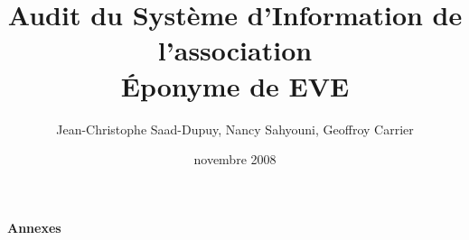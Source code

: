 \documentclass[a4paper,10pt,twoside]{article}
\title{Audit du Système d'Information de l'association \\ \Huge{Éponyme de EVE}}
\author{Jean-Christophe Saad-Dupuy, Nancy Sahyouni, Geoffroy Carrier}
\date{novembre 2008}
\begin{document}
\maketitle

\tableofcontents






\newpage
\appendix
\textbf{\Huge{Annexes}}

\end{document}
